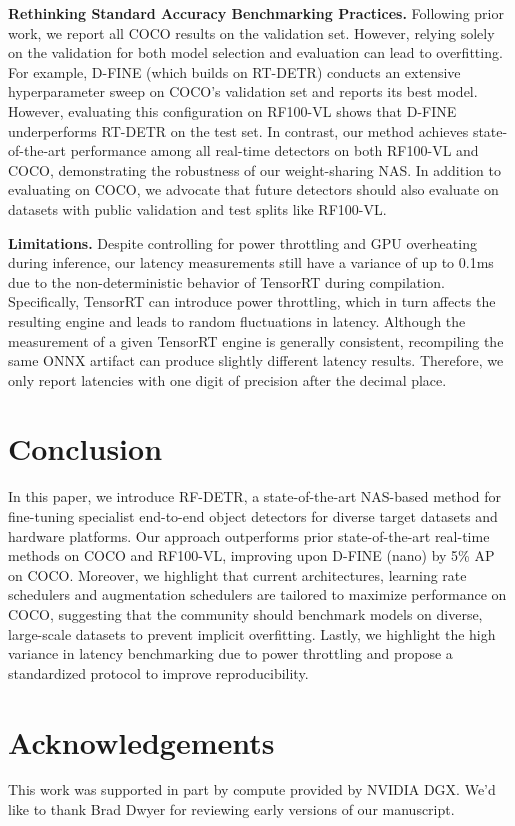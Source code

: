 \documentclass{article} %
\newcommand\isaac[1]{\textcolor{purered}{[Isaac: #1]}}
\newcommand{\method}{RF-DETR}
\begin{document}
\textbf{Rethinking Standard Accuracy Benchmarking Practices.} Following prior work, we report all COCO results on the validation set. However, relying solely on the validation for both model selection and evaluation can lead to overfitting. For example, D-FINE (which builds on RT-DETR) conducts an extensive hyperparameter sweep on COCO's validation set and reports its best model. However, evaluating this configuration on RF100-VL shows that D-FINE underperforms RT-DETR on the test set. In contrast, our method achieves state-of-the-art performance among all real-time detectors on both RF100-VL and COCO, demonstrating the robustness of our weight-sharing NAS. In addition to evaluating on COCO, we advocate that future detectors should also evaluate on datasets with public validation and test splits like RF100-VL.


\textbf{Limitations.} Despite controlling for power throttling and GPU overheating during inference, our latency measurements still have a variance of up to 0.1ms due to the non-deterministic behavior of TensorRT during compilation. Specifically, TensorRT can introduce power throttling, which in turn affects the resulting engine and leads to random fluctuations in latency. Although the measurement of a given TensorRT engine is generally consistent, recompiling the same ONNX artifact can produce slightly different latency results. Therefore, we only report latencies with one digit of precision after the decimal place. %

\section{Conclusion}
In this paper, we introduce \method, a state-of-the-art NAS-based method for fine-tuning specialist end-to-end object detectors for diverse target datasets and hardware platforms. Our approach outperforms prior state-of-the-art real-time methods on COCO and RF100-VL, improving upon D-FINE (nano) by 5\% AP on COCO. Moreover, we highlight that current architectures, learning rate schedulers and augmentation schedulers are tailored to maximize performance on COCO, suggesting that the community should benchmark models on diverse, large-scale datasets to prevent implicit overfitting. Lastly, we highlight the high variance in latency benchmarking due to power throttling and propose a standardized protocol to improve reproducibility.

\section*{Acknowledgements}
This work was supported in part by compute provided by NVIDIA DGX. We'd like to thank Brad Dwyer for reviewing early versions of our manuscript. 

\clearpage
\newpage




\newpage 


\end{document}
